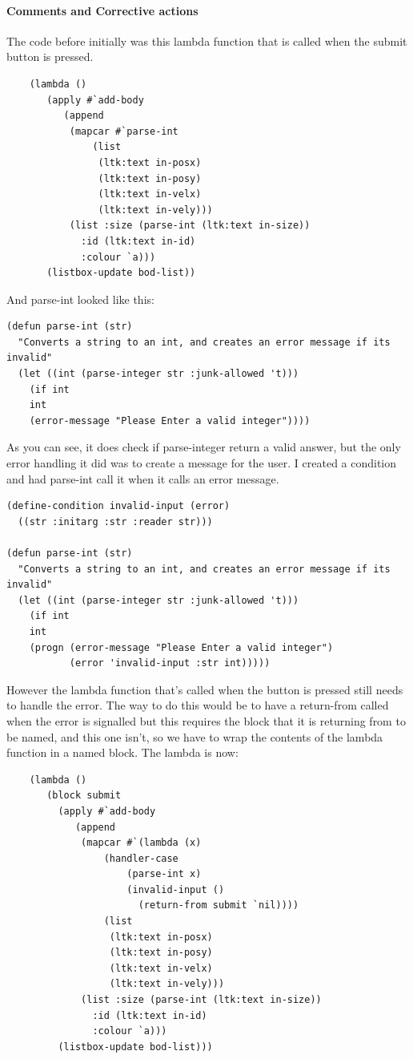 \paragraph{Comments and Corrective actions}
The code before initially was this lambda function that is called when the
submit button is pressed. 
\begin{lstlisting}
	(lambda ()
	   (apply #`add-body
		  (append
		   (mapcar #`parse-int
			   (list
			    (ltk:text in-posx)
			    (ltk:text in-posy)
			    (ltk:text in-velx)
			    (ltk:text in-vely)))
		   (list :size (parse-int (ltk:text in-size))
			 :id (ltk:text in-id)
			 :colour `a)))
	   (listbox-update bod-list))
\end{lstlisting}
And parse-int looked like this:
\begin{lstlisting}
(defun parse-int (str)
  "Converts a string to an int, and creates an error message if its invalid"
  (let ((int (parse-integer str :junk-allowed 't)))
    (if int
	int
	(error-message "Please Enter a valid integer"))))
\end{lstlisting}
As you can see, it does check if parse-integer return a valid answer, but the
only error handling it did was to create a message for the user. I created a
condition and had parse-int call it when it calls an error message.
\begin{lstlisting}
(define-condition invalid-input (error)
  ((str :initarg :str :reader str)))

(defun parse-int (str)
  "Converts a string to an int, and creates an error message if its invalid"
  (let ((int (parse-integer str :junk-allowed 't)))
    (if int
	int
	(progn (error-message "Please Enter a valid integer")
	       (error 'invalid-input :str int)))))
\end{lstlisting}
However the lambda function that's called when the button is pressed still needs
to handle the error. The way to do this would be to have a return-from called
when the error is signalled but this requires the block that it is returning
from to be named, and this one isn't, so we have to wrap the contents of the
lambda function in a named block. The lambda is now:
\begin{lstlisting}
	(lambda ()
	   (block submit
	     (apply #`add-body
		    (append
		     (mapcar #`(lambda (x)
				 (handler-case
				     (parse-int x)
				     (invalid-input ()
				       (return-from submit `nil))))
			     (list
			      (ltk:text in-posx)
			      (ltk:text in-posy)
			      (ltk:text in-velx)
			      (ltk:text in-vely)))
		     (list :size (parse-int (ltk:text in-size))
			   :id (ltk:text in-id)
			   :colour `a)))
	     (listbox-update bod-list)))
\end{lstlisting}

